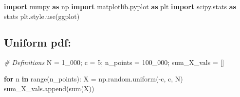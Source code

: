 \documentclass[
]{article}
\author{}
\date{}
\newenvironment{Shaded}{}{}
\newcommand{\BuiltInTok}[1]{\textcolor[rgb]{0.00,0.50,0.00}{#1}}
\newcommand{\CommentTok}[1]{\textcolor[rgb]{0.38,0.63,0.69}{\textit{#1}}}
\newcommand{\ControlFlowTok}[1]{\textcolor[rgb]{0.00,0.44,0.13}{\textbf{#1}}}
\newcommand{\DecValTok}[1]{\textcolor[rgb]{0.25,0.63,0.44}{#1}}
\newcommand{\ImportTok}[1]{\textcolor[rgb]{0.00,0.50,0.00}{\textbf{#1}}}
\newcommand{\KeywordTok}[1]{\textcolor[rgb]{0.00,0.44,0.13}{\textbf{#1}}}
\newcommand{\NormalTok}[1]{#1}
\newcommand{\OperatorTok}[1]{\textcolor[rgb]{0.40,0.40,0.40}{#1}}
\newcommand{\StringTok}[1]{\textcolor[rgb]{0.25,0.44,0.63}{#1}}
\begin{document}
\begin{Shaded}
\begin{Highlighting}[]
\ImportTok{import}\NormalTok{ numpy }\ImportTok{as}\NormalTok{ np}
\ImportTok{import}\NormalTok{ matplotlib.pyplot }\ImportTok{as}\NormalTok{ plt}
\ImportTok{import}\NormalTok{ scipy.stats }\ImportTok{as}\NormalTok{ stats}
\NormalTok{plt.style.use(}\StringTok{\textquotesingle{}ggplot\textquotesingle{}}\NormalTok{)}
\end{Highlighting}
\end{Shaded}

\hypertarget{uniform-pdf}{%
\subsection{Uniform pdf:}\label{uniform-pdf}}

\begin{Shaded}
\begin{Highlighting}[]
\CommentTok{\# Definitions}
\NormalTok{N }\OperatorTok{=} \DecValTok{1\_000}\OperatorTok{;}\NormalTok{ c }\OperatorTok{=} \DecValTok{5}\OperatorTok{;}\NormalTok{ n\_points }\OperatorTok{=} \DecValTok{100\_000}\OperatorTok{;}\NormalTok{ sum\_X\_vals }\OperatorTok{=}\NormalTok{ []}

\ControlFlowTok{for}\NormalTok{ n }\KeywordTok{in} \BuiltInTok{range}\NormalTok{(n\_points):}
\NormalTok{    X }\OperatorTok{=}\NormalTok{ np.random.uniform(}\OperatorTok{{-}}\NormalTok{c, c, N)}
\NormalTok{    sum\_X\_vals.append(}\BuiltInTok{sum}\NormalTok{(X))}
\end{Highlighting}
\end{Shaded}
\end{document}
